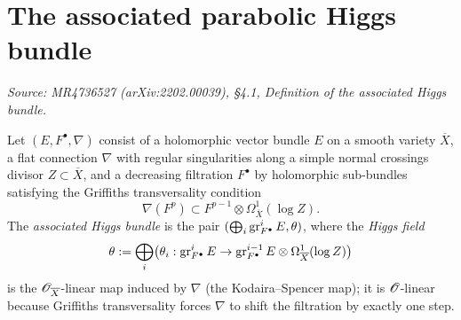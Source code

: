 \section{The associated parabolic Higgs bundle}

\begin{definition}
  \label{def:parabolic-higgs}
  \textit{Source: MR4736527 (arXiv:2202.00039), §4.1, Definition of the
  associated Higgs bundle.}

  Let \((E, F^\bullet, \nabla)\) consist of a holomorphic vector bundle \(E\) on a
  smooth variety \(\overline{X}\), a flat connection \(\nabla\) with regular
  singularities along a simple normal crossings divisor \(Z \subset \overline{X}\),
  and a decreasing filtration \(F^\bullet\) by holomorphic sub-bundles satisfying
  the Griffiths transversality condition
  \begin{equation}\label{eqn:griffiths-transversality-2}
    \nabla(F^p) \subset F^{p-1} \otimes \Omega^1_{\overline{X}}(\log Z).
  \end{equation}
  The \emph{associated Higgs bundle} is the pair \((\bigoplus_i \operatorname{gr}^i_{F^\bullet} E,
  \theta)\), where the \emph{Higgs field}
  \[
    \theta := \bigoplus_i \bigl(\theta_i : \operatorname{gr}^i_{F^\bullet} E \to
    \operatorname{gr}^{i-1}_{F^\bullet} E \otimes \Omega^1_{\overline{X}}(\log Z)\bigr)
  \]
  is the \(\mathscr{O}_{\overline{X}}\)-linear map induced by \(\nabla\) (the
  Kodaira--Spencer map); it is \(\mathscr{O}\)-linear because Griffiths transversality
  forces \(\nabla\) to shift the filtration by exactly one step.


\end{definition}
